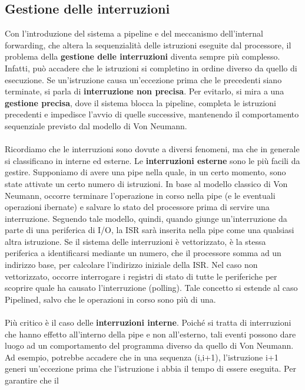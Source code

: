 \subsection{Gestione delle interruzioni}
Con l'introduzione del sistema a pipeline e del meccanismo dell'internal forwarding, che altera la sequenzialità delle istruzioni eseguite dal processore, il problema della \textbf{gestione delle interruzioni} diventa sempre più complesso. Infatti, può accadere che le istruzioni si completino in ordine diverso da quello di esecuzione. Se un'istruzione causa un'eccezione prima che le precedenti siano terminate, si parla di \textbf{interruzione non precisa}.
Per evitarlo, si mira a una \textbf{gestione precisa}, dove il sistema blocca la pipeline, completa le istruzioni precedenti e impedisce l'avvio di quelle successive, mantenendo il comportamento sequenziale previsto dal modello di Von Neumann.
\\
\\
Ricordiamo che le interruzioni sono dovute a diversi fenomeni, ma che in generale si classificano in interne ed esterne.
Le \textbf{interruzioni esterne} sono le più facili da gestire. Supponiamo di avere una pipe nella quale, in un certo momento, sono state attivate un certo numero di istruzioni. In base al modello classico di Von Neumann, occorre terminare l'operazione in corso nella pipe (e le eventuali operazioni ibernate) e salvare lo stato del processore prima di servire una interruzione. Seguendo tale modello, quindi, quando giunge un'interruzione da parte di una periferica di I/O, la ISR sarà inserita nella pipe come una qualsiasi altra istruzione. Se il sistema delle interruzioni è vettorizzato, è la stessa periferica a identificarsi mediante un numero, che il 
processore somma ad un indirizzo base, per calcolare l'indirizzo iniziale della ISR. Nel caso non vettorizzato, occorre interrogare i registri di stato di tutte le periferiche per scoprire quale ha causato l’interruzione (polling). Tale concetto si estende al caso Pipelined, salvo che le operazioni
in corso sono più di una.
\\
\\
Più critico è il caso delle \textbf{interruzioni interne}. Poiché si tratta di interruzioni che hanno effetto 
all'interno della pipe e non all'esterno, tali eventi possono dare luogo ad un comportamento del programma diverso da quello di Von Neumann. Ad esempio, potrebbe accadere che in una sequenza (i,i+1), l'istruzione i+1 generi un'eccezione prima che l'istruzione i abbia il tempo di essere eseguita. Per garantire che il 
